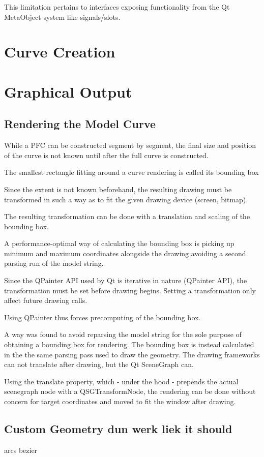 This limitation pertains to interfaces exposing functionality from the Qt MetaObject system like signals/slots.

\section{Curve Creation}

\section{Graphical Output}
\subsection{Rendering the Model Curve}
While a PFC can be constructed segment by segment, the final size and position of the curve is not known until after the full curve is constructed.

The smallest rectangle fitting around a curve rendering is called its  \gls{bounding box}

Since the extent is not known beforehand, the resulting drawing must be transformed in such a way as to fit the given drawing device (screen, bitmap).

The resulting transformation can be done with a translation and scaling of the bounding box.

A performance-optimal way of calculating the bounding box is picking up minimum and maximum coordinates alongside the drawing avoiding a second parsing run of the model string.

Since the \gls{QPainter} API used by Qt is iterative in nature (\gls{QPainter} API), the transformation must be set before drawing begins. Setting a transformation only affect future drawing calls.

Using \gls{QPainter} thus forces precomputing of the bounding box.


A way was found to avoid reparsing the model string for the sole purpose of obtaining a bounding box for rendering.
The bounding box is instead calculated in the the same parsing pass used to draw the geometry. The drawing frameworks can not translate after drawing, but the Qt SceneGraph can.

Using the translate property, which - under the hood - prepends the actual scenegraph node with a QSGTransformNode, the rendering can be done without concern for target coordinates and moved to fit the window after drawing.

\subsection{Custom Geometry dun werk liek it should}
\label{sec:implrenderprob}
arcs bezier
